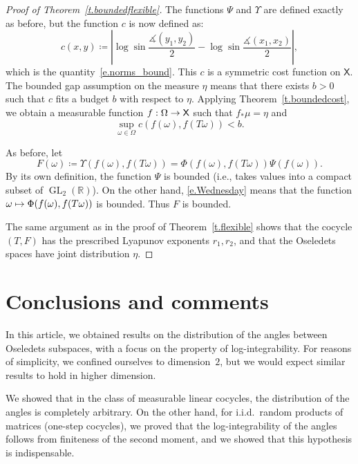 \documentclass[AHL,Unicode,longabstracts,published]{cedram}
\newcommand{\R}{\mathbb{R}}
\newcommand{\sfX}{\mathsf{X}}
\DeclareMathOperator{\GL}{GL}
\renewcommand{\angle}{\measuredangle}
\renewcommand*{\to}{\mathchoice{\longrightarrow}{\rightarrow}{\rightarrow}{\rightarrow}}
\let\oldmapsto\mapsto
\renewcommand*{\mapsto}{\mathchoice{\longmapsto}{\oldmapsto}{\oldmapsto}{\oldmapsto}}
\DeclareMathOperator{\GL}{GL}
\newcommand{\R}{\mathbb{R}}
\begin{document}
\begin{proof}[Proof of Theorem~\ref{t.boundedflexible}]
The functions $\Psi$ and $\Upsilon$ are defined exactly as before, but the function $c$ is now defined as:
\begin{equation}
c(x,y) \coloneqq \left| \log \sin \frac{\angle(y_1,y_2)}{2} - \log \sin \frac{\angle(x_1,x_2)}{2} \right|,
\end{equation}
which is the quantity~\eqref{e.norms_bound}. This $c$ is a symmetric cost function on $\sfX$. The bounded gap assumption on the measure $\eta$ means that there exists $b>0$ such that $c$ fits a budget $b$ with respect to $\eta$. Applying Theorem~\ref{t.boundedcost}, we obtain a measurable function $f:\Omega \to \sfX$ such that $f_*\mu = \eta$ and
\begin{equation}\label{e.Wednesday}
\sup_{\omega \in \Omega} c(f(\omega),f(T\omega)) < b.
\end{equation}

As before, let
\begin{equation}
F(\omega) \coloneqq \Upsilon(f(\omega),f(T \omega)) = \Phi(f(\omega),f(T \omega)) \Psi(f(\omega)).
\end{equation}
By its own definition, the function $\Psi$ is bounded (i.e., takes values into a compact subset of $\GL_2(\R)$). On the other hand, \eqref{e.Wednesday} means that the function $\omega \mapsto \Phi(f(\omega),\linebreak f(T \omega))$ is bounded. Thus $F$ is bounded.

The same argument as in the proof of Theorem~\ref{t.flexible} shows that the cocycle $(T,F)$ has the prescribed Lyapunov exponents $r_1,r_2$, and that the Oseledets spaces have joint distribution $\eta$.
\end{proof}

\section{Conclusions and comments} \label{s.conclusion}


In this article, we obtained results on the distribution of the angles between Oseledets subspaces, with a focus on the property of log-integrability. For reasons of simplicity, we confined ourselves to dimension~$2$, but we would expect similar results to hold in higher dimension.

We showed that in the class of measurable linear cocycles, the distribution of the angles is completely arbitrary. On the other hand, for i.i.d.\ random products of matrices (one-step cocycles), we proved that the log-integrability of the angles follows from finiteness of the second moment, and we showed that this hypothesis is indispensable.
\end{document}
